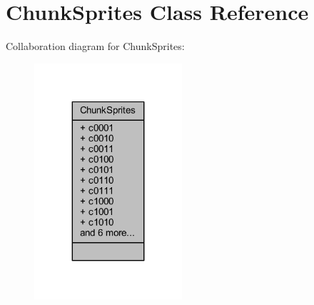 \hypertarget{class_chunk_sprites}{}\section{Chunk\+Sprites Class Reference}
\label{class_chunk_sprites}


Collaboration diagram for Chunk\+Sprites\+:\nopagebreak
\begin{figure}[H]
\begin{center}
\leavevmode
\includegraphics[width=155pt]{class_chunk_sprites__coll__graph}
\end{center}
\end{figure}
